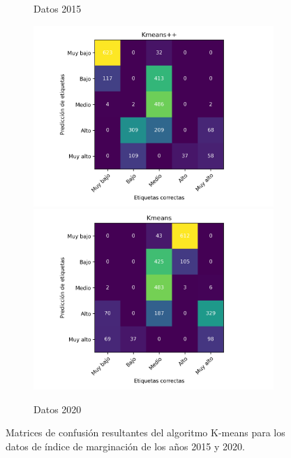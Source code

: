 \begin{figure}[H]
\begin{subfigure}{8.4cm}
        \caption{Datos 2015}
    \end{subfigure}
    \begin{subfigure}{8.4cm}
        \includegraphics[width=1\linewidth]{Graphics/Data_2020/Kmeans++_confusion_matrix.png}
        \includegraphics[width=1\linewidth]{Graphics/Data_2020/Kmeans_random_confusion_matrix.png}
        \caption{Datos 2020}
    \end{subfigure}
    \caption{Matrices de confusión resultantes del algoritmo K-means para los datos de índice de marginación de los años 2015 y 2020.}
    \label{fig:kmeans}
\end{figure}